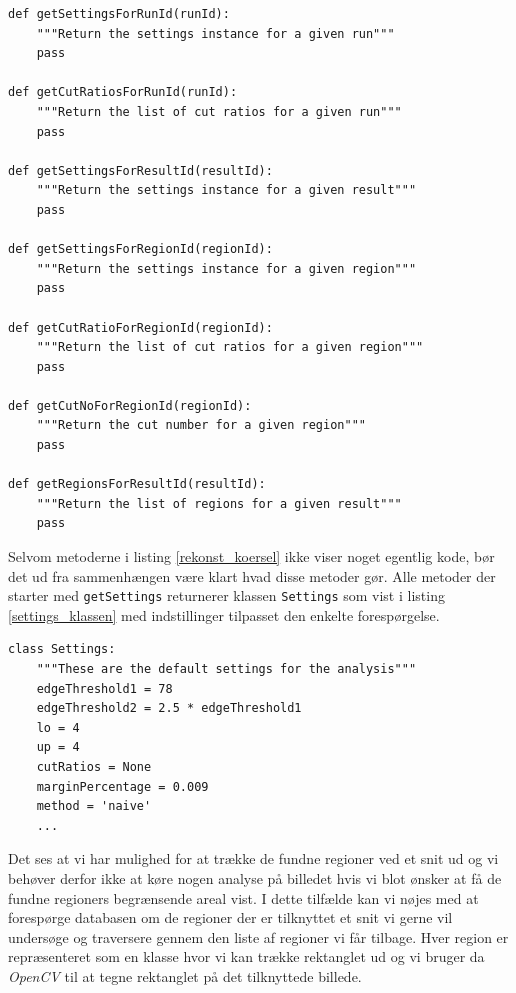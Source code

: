 {\vspace{0.5cm}
\begin{lstlisting}[caption={Metoder til rekonstruktion af kørsler},captionpos=b,label={rekonst_koersel},numbers=none]
def getSettingsForRunId(runId):
    """Return the settings instance for a given run"""
    pass

def getCutRatiosForRunId(runId):
    """Return the list of cut ratios for a given run"""
    pass

def getSettingsForResultId(resultId):
    """Return the settings instance for a given result"""
    pass

def getSettingsForRegionId(regionId):
    """Return the settings instance for a given region"""
    pass

def getCutRatioForRegionId(regionId):
    """Return the list of cut ratios for a given region"""
    pass

def getCutNoForRegionId(regionId):
    """Return the cut number for a given region"""
    pass

def getRegionsForResultId(resultId):
    """Return the list of regions for a given result"""
    pass
\end{lstlisting}

Selvom metoderne i listing \ref{rekonst_koersel} ikke viser noget
egentlig kode, bør det ud fra sammenhængen være klart hvad disse metoder
gør. Alle metoder der starter med \texttt{getSettings} returnerer
klassen \texttt{Settings} som vist i listing \ref{settings_klassen} med
indstillinger tilpasset den enkelte forespørgelse.
\vspace{0.5cm}
\begin{lstlisting}[caption={Settings-klassen med standardindstillinger},captionpos=b,label={settings_klassen},numbers=none]
class Settings:
    """These are the default settings for the analysis"""
    edgeThreshold1 = 78
    edgeThreshold2 = 2.5 * edgeThreshold1
    lo = 4
    up = 4
    cutRatios = None
    marginPercentage = 0.009
    method = 'naive'
    ...
\end{lstlisting}

Det ses at vi har mulighed for at trække de fundne regioner ved et
snit ud og vi behøver derfor ikke at køre nogen analyse på billedet hvis
vi blot ønsker at få de fundne regioners begrænsende areal vist. I dette
tilfælde kan vi nøjes med at forespørge databasen om de regioner der er
tilknyttet et snit vi gerne vil undersøge og traversere gennem den liste
af regioner vi får tilbage. Hver region er repræsenteret som en klasse
hvor vi kan trække rektanglet ud og vi bruger da \emph{OpenCV} til at
tegne rektanglet på det tilknyttede billede.
}
